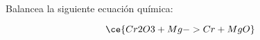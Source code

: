 Balancea la siguiente ecuación química:

\[
    \ce{Cr2O3 + Mg -> Cr + MgO}
\]

\begin{solutionbox}{5cm}

\end{solutionbox}